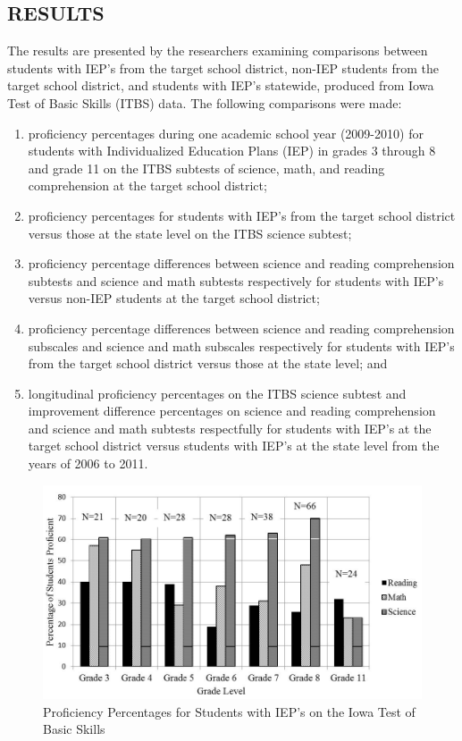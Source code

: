 \documentclass[11.5pt]{sig-alternate} %
\begin{document}
\begin{large}
\section*{RESULTS}
The results are presented by the researchers examining comparisons between students with IEP’s from the target school district, non-IEP students from the target school district, and students with IEP’s statewide, produced from Iowa Test of Basic Skills (ITBS) data. The following comparisons were made: 
\begin{enumerate}[label=(\alph*)]
    \item proficiency percentages during one academic school year (2009-2010) for students with Individualized Education Plans (IEP) in grades 3 through 8 and grade 11 on the ITBS subtests of science, math, and reading comprehension at the target school district;
    \item proficiency percentages for students with IEP’s from the target school district versus those at the state level on the ITBS science subtest;
    \item proficiency percentage differences between science and reading comprehension subtests and science and math subtests respectively for students with IEP’s versus non-IEP students at the target school district;
    \item proficiency percentage differences between science and reading comprehension subscales and science and math subscales respectively for students with IEP’s from the target school district versus those at the state level; and
    \item longitudinal proficiency percentages on the ITBS science subtest and improvement difference percentages on science and reading comprehension and science and math subtests respectfully for students with IEP’s at the target school district versus students with IEP’s at the state level from the years of 2006 to 2011.
\end{enumerate}

\begin{figure}
    \centering
    \includegraphics{Figure 1.jpg}
    \caption{Proficiency Percentages for Students with IEP's on the Iowa Test of Basic Skills}
    \label{fig:Figure 1}
\end{figure}


\end{large}
\end{document}
